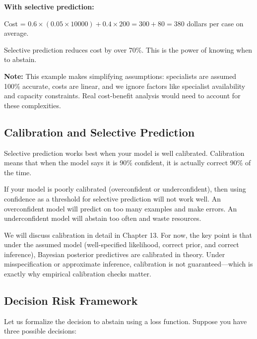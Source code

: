 \begin{examplebox}
\vspace{0.5em}

\textbf{With selective prediction:}

Cost = $0.6 \times (0.05 \times 10000) + 0.4 \times 200 = 300 + 80 = 380$ dollars per case on average.

\vspace{0.5em}

Selective prediction reduces cost by over 70\%. This is the power of knowing when to abstain.

\vspace{0.5em}

\textbf{Note:} This example makes simplifying assumptions: specialists are assumed 100\% accurate, costs are linear, and we ignore factors like specialist availability and capacity constraints. Real cost-benefit analysis would need to account for these complexities.
\end{examplebox}

\vspace{1.5em}

\subsection{Calibration and Selective Prediction}

Selective prediction works best when your model is well calibrated. Calibration means that when the model says it is 90\% confident, it is actually correct 90\% of the time.

If your model is poorly calibrated (overconfident or underconfident), then using confidence as a threshold for selective prediction will not work well. An overconfident model will predict on too many examples and make errors. An underconfident model will abstain too often and waste resources.

We will discuss calibration in detail in Chapter 13. For now, the key point is that under the assumed model (well-specified likelihood, correct prior, and correct inference), Bayesian posterior predictives are calibrated in theory. Under misspecification or approximate inference, calibration is not guaranteed---which is exactly why empirical calibration checks matter.

\subsection{Decision Risk Framework}

Let us formalize the decision to abstain using a loss function. Suppose you have three possible decisions:

